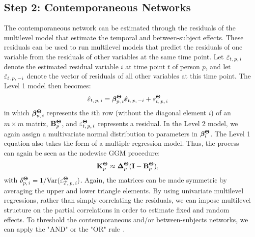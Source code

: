 \subsection{Step 2: Contemporaneous Networks}
The contemporaneous network can be estimated through the residuals of the multilevel model that estimate the temporal and between-subject effects. These residuals can be used to run multilevel models that predict the residuals of one variable from the residuals of other variables at the same time point. Let $\hat{\varepsilon}_{t,\,p,\,i}$ denote the estimated residual variable $i$ at time point $t$ of person $p$, and let $\hat{\varepsilon}_{t,\,p,\,-i}$ denote the vector of residuals of all other variables at this time point. The Level 1 model then becomes:
\begin{equation}
    \hat{\varepsilon}_{t,\,p,\,i} = \bm{\beta}_{p,\,i}^{\bm{\Theta}} \hat{\bm{\varepsilon}}_{t,\,p,\,-i} + \varepsilon_{t,\,p,\,i}^{\bm{\Theta}}
\end{equation}
in which $\bm{\beta}_{p,\,i}^{\bm{\Theta}}$ represents the $i$th row (without the diagonal element $i$) of an $m \times m$ matrix, $\mathbf{B}_p^{\bm{\Theta}}$, and $\varepsilon_{t,\,p,\,i}^{\bm{\Theta}}$ represents a residual. In the Level 2 model, we again assign a multivariate normal distribution to parameters in $\bm{\beta}_i^{\bm{\Theta}}$. The Level 1 equation also takes the form of a multiple regression model. Thus, the process can again be seen as the nodewise GGM procedure:
\begin{equation}
    \mathbf{K}_p^{\bm{\Theta}} \approx \bm{\Delta}_p^{\bm{\Theta}} (\mathbf{I} - \mathbf{B}_p^{\bm{\Theta}}),
\end{equation}
with $\delta_{p,\,i}^{\bm{\Theta}} = 1/\text{Var}(\varepsilon_{T,\,p,\,i}^{\bm{\Theta}})$. Again, the matrices can be made symmetric by averaging the upper and lower triangle elements. By using univariate multilevel regressions, rather than simply correlating the residuals, we can impose multilevel structure on the partial correlations in order to estimate fixed and random effects. To threshold the contemporaneous and/or between-subjects networks, we can apply the "AND" or the "OR" rule \cite{barber2015high}.

